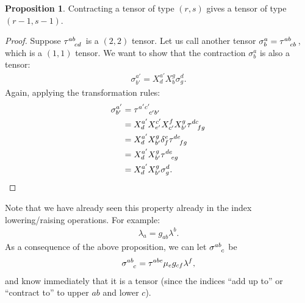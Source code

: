 \documentclass{book}
\theoremstyle{definition}
\newtheorem{prop}{Proposition}[section]
\begin{document}
\begin{prop}
	Contracting a tensor of type $(r,s)$ gives a tensor of type $(r-1,s-1)$.
\end{prop}
\begin{proof}
	Suppose $\tensor{\tau}{^{ab}_{cd}}$ is a $(2,2)$ tensor. Let us call another tensor $\sigma^{a}_b = \tensor{\tau}{^{ab}_{cb}}$, which is a $(1,1)$ tensor. We want to show that the contraction $\sigma^{a}_{b}$ is also a tensor:
	\begin{align*}
	\sigma^{a'}_{b'} = X^{a'}_{d}X^{g}_{b}\sigma^{d}_g.
	\end{align*}
	Again, applying the transformation rules:
	\begin{align*}
	\sigma^{a'}_{b'} &= \tensor{\tau}{^{a'c'}_{c'b'}}\\
	&= X^{a'}_{d}X^{c'}_{e'}X^{f}_{c'}X^{g}_{b'}\tensor{\tau}{^{dc}_{fg}}\\
	&= X^{a'}_{d}X^{g}_{b'}\delta^{e}_f\tensor{\tau}{^{de}_{fg}}\\
	&= X^{a'}_{d}X^{g}_{b'}\tensor{\tau}{^{de}_{eg}}\\
	&= X^{a'}_{d}X^{g}_{b'}\sigma^{d}_g.
	\end{align*}
\end{proof}
Note that we have already seen this property already in the index lowering/raising operations. For example:
\begin{align*}
\lambda_a = g_{ab}\lambda^b.
\end{align*}
As a consequence of the above proposition, we can let $\tensor{\sigma}{^{ab}_{c}}$ be
\begin{align*}
\tensor{\sigma}{^{ab}_{c}} = \tensor{\tau}{^{abe}}\mu_eg_{cf}\lambda^f,
\end{align*}
and know immediately that it is a tensor (since the indices ``add up to'' or ``contract to'' to upper $ab$ and lower $c$).
\end{document}
